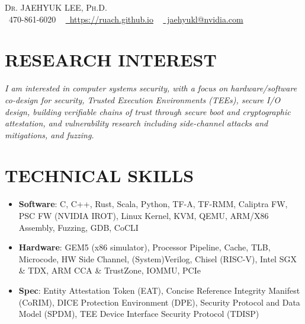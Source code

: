 \documentclass[letterpaper,11pt]{article}
\makeatletter
\newcommand{\timelineChart}{%
\noindent\resizebox{\textwidth}{!}{%
\begin{tikzpicture}[x=1.27cm, y=1.0cm, font=\scriptsize]

  \draw[gray!50, line width=0.6pt] (0,0) -- (13.1,0);

  \foreach \yr/\lbl in {0/2013,2/2015,4/2017,6/2019,8/2021,10/2023,12/2025}{
    \draw[gray!50] (\yr, 0.06) -- (\yr, -0.06);
    \node[gray!60, anchor=north, font=\tiny] at (\yr, -0.1) {\lbl};
  }

  \fill[rounded corners=2pt, cAcademia!75]
    (0.67, 0.06) rectangle node[font=\tiny\bfseries, white] {M.S.\ KAIST} (2.67, 0.38);
  \fill[rounded corners=2pt, cAcademia!90]
    (2.67, 0.06) rectangle node[font=\tiny\bfseries, white] {Ph.D.\ @ KAIST} (8.17, 0.38);
  \fill[rounded corners=1pt, cIntern!85]
    (3.42, 0.06) rectangle (3.67, 0.38);
  \node[cIntern!90, anchor=south, font=\tiny\bfseries] at (3.545, 0.42) {MSR};
  \fill[rounded corners=1pt, cIntern!85]
    (6.83, 0.06) rectangle (7.42, 0.38);
  \node[cIntern!90, anchor=south, font=\tiny\bfseries] at (7.125, 0.42) {GT Intern};
  \fill[rounded corners=2pt, cAcademia!60]
    (8.17, 0.06) rectangle (8.92, 0.38);
  \node[cAcademia!80, anchor=south, font=\tiny\bfseries] at (8.545, 0.42) {PD};
  \fill[rounded corners=2pt, cAcademia!85]
    (9.0, 0.06) rectangle node[font=\tiny\bfseries, white] {GT Postdoc} (11.5, 0.38);
  \fill[rounded corners=2pt, cIndustry!90]
    (11.5, 0.06) rectangle node[font=\tiny\bfseries, white] {NVIDIA} (13.1, 0.38);

  \def\pina{-0.55}  %
  \def\pinb{-1.05}  %

  \draw[cPaper!70, line width=0.5pt] (2.0,0) -- (2.0,\pina);
  \fill[cPaper] (2.0,0) circle (1.8pt);
  \node[cPaper, anchor=north, align=center, font=\tiny] at (2.0,\pina) {OpenSGX\\NDSS'15};

  \draw[cPaper!70, line width=0.5pt] (3.0,0) -- (3.0,\pinb);
  \fill[cPaper] (3.0,0) circle (1.8pt);
  \node[cPaper, anchor=north, align=center, font=\tiny] at (3.0,\pinb) {PrivateZone\\TDSC'16};

  \draw[cPaper!70, line width=0.5pt] (4.0,0) -- (4.0,\pina);
  \fill[cPaper] (4.0,0) circle (1.8pt);
  \node[cPaper, anchor=north, align=center, font=\tiny] at (4.0,\pina) {SGX-Bomb\\SysTEX'17};

  \draw[cPaper!70, line width=0.5pt] (4.67,0) -- (4.67,\pinb);
  \fill[cPaper] (4.67,0) circle (1.8pt);
  \node[cPaper, anchor=north, align=center, font=\tiny] at (4.67,\pinb) {Dark-ROP\\USENIX'17};

  \draw[cPaper!70, line width=0.5pt] (8.5,0) -- (8.5,\pina);
  \fill[cPaper] (8.5,0) circle (1.8pt);
  \node[cPaper, anchor=north, align=center, font=\tiny] at (8.5,\pina) {P+RETOUCH\\arXiv'21};

  \draw[cPaper!70, line width=0.5pt] (10.6,0) -- (10.6,\pinb);
  \fill[cPaper] (10.6,0) circle (1.8pt);
  \node[cPaper, anchor=north, align=center, font=\tiny] at (10.6,\pinb) {autofz\\USENIX'23};

  \draw[cPaper!70, line width=0.5pt] (11.1,0) -- (11.1,\pina);
  \fill[cPaper] (11.1,0) circle (1.8pt);
  \node[cPaper, anchor=north, align=center, font=\tiny] at (11.1,\pina) {SENSE\\NDSS'24};

  \draw[cPaper!70, line width=0.5pt] (11.7,0) -- (11.7,\pinb);
  \fill[cPaper] (11.7,0) circle (1.8pt);
  \node[cPaper, anchor=north, align=center, font=\tiny] at (11.7,\pinb) {DeFi\\USENIX'24};

  \draw[cPaper!70, line width=0.5pt] (12.3,0) -- (12.3,\pina);
  \fill[cPaper] (12.3,0) circle (1.8pt);
  \node[cPaper, anchor=north, align=center, font=\tiny] at (12.3,\pina) {PORTAL\\SP'25};

  \fill[rounded corners=1pt, cAcademia!85] (7.5,-1.65) rectangle (7.85,-1.45)
    node[right, black, font=\tiny] {\ Academia};
  \fill[rounded corners=1pt, cIntern!85]   (9.3,-1.65) rectangle (9.65,-1.45)
    node[right, black, font=\tiny] {\ Internship};
  \fill[rounded corners=1pt, cIndustry!90] (11.1,-1.65) rectangle (11.45,-1.45)
    node[right, black, font=\tiny] {\ Industry};

\end{tikzpicture}%
}%
}
\makeatother
\begin{document}
\begin{center}
    {\huge \scshape Dr. JAEHYUK LEE, Ph.D.} \\ \vspace{1pt}
    \small
    \raisebox{-0.1\height}\faPhone\ 470-861-6020 ~
    \href{https://ruach.github.io}{\faHome\ https://ruach.github.io} ~
    \href{mailto:jaehyukl@nvidia.com}{\faEnvelope\ jaehyukl@nvidia.com} ~ 
    \vspace{-10pt}
\end{center}
%
\section{RESEARCH INTEREST}
\begin{interestbox}
\small\emph{I am interested in computer systems security, with a focus on hardware/software co-design for security, Trusted Execution Environments (TEEs), secure I/O design, building verifiable chains of trust through secure boot and cryptographic attestation, and vulnerability research including side-channel attacks and mitigations, and fuzzing.}
\end{interestbox}
\vspace{-3pt}
%
\section{TECHNICAL SKILLS}
\begin{itemize}[leftmargin=0.1in, label={}, itemsep=1pt, topsep=0pt, parsep=0pt]
    \item \small\textbf{Software}: C, C++, Rust, Scala, Python, TF-A, TF-RMM, Caliptra FW, PSC FW (NVIDIA IROT), Linux Kernel, KVM, QEMU, ARM/X86 Assembly, Fuzzing, GDB, CoCLI
    \item \small\textbf{Hardware}: GEM5 (x86 simulator), Processor Pipeline, Cache, TLB, Microcode, HW Side Channel, (System)Verilog, Chisel (RISC-V), Intel SGX \& TDX, ARM CCA \& TrustZone, IOMMU, PCIe
    \item \small\textbf{Spec}: Entity Attestation Token (EAT), Concise Reference Integrity Manifest (CoRIM), DICE Protection Environment (DPE), Security Protocol and Data Model (SPDM), TEE Device Interface Security Protocol (TDISP)
\end{itemize}
\vspace{-4pt}
\end{document}
